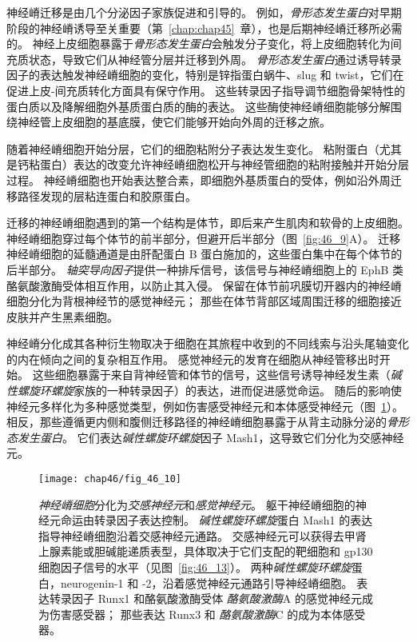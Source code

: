 神经嵴迁移是由几个分泌因子家族促进和引导的。
例如，\textit{骨形态发生蛋白}对早期阶段的神经嵴诱导至关重要（第~\ref{chap:chap45}~章），也是后期神经嵴迁移所必需的。
神经上皮细胞暴露于\textit{骨形态发生蛋白}会触发分子变化，将上皮细胞转化为间充质状态，导致它们从神经管分层并迁移到外周。
\textit{骨形态发生蛋白}通过诱导转录因子的表达触发神经嵴细胞的变化，特别是锌指蛋白蜗牛、slug 和 twist，它们在促进上皮-间充质转化方面具有保守作用。
这些转录因子指导调节细胞骨架特性的蛋白质以及降解细胞外基质蛋白质的酶的表达。
这些酶使神经嵴细胞能够分解围绕神经管上皮细胞的基底膜，使它们能够开始向外周的迁移之旅。


随着神经嵴细胞开始分层，它们的细胞粘附分子表达发生变化。
粘附蛋白（尤其是钙粘蛋白）表达的改变允许神经嵴细胞松开与神经管细胞的粘附接触并开始分层过程。
神经嵴细胞也开始表达整合素，即细胞外基质蛋白的受体，例如沿外周迁移路径发现的层粘连蛋白和胶原蛋白。


迁移的神经嵴细胞遇到的第一个结构是体节，即后来产生肌肉和软骨的上皮细胞。
神经嵴细胞穿过每个体节的前半部分，但避开后半部分（图~\ref{fig:46_9}A）。
迁移神经嵴细胞的延髓通道是由肝配蛋白 B 蛋白施加的，这些蛋白集中在每个体节的后半部分。
\textit{轴突导向因子}提供一种排斥信号，该信号与神经嵴细胞上的 EphB 类酪氨酸激酶受体相互作用，以防止其入侵。
保留在体节前巩膜切开器内的神经嵴细胞分化为背根神经节的感觉神经元；
那些在体节背部区域周围迁移的细胞接近皮肤并产生黑素细胞。


神经嵴分化成其各种衍生物取决于细胞在其旅程中收到的不同线索与沿头尾轴变化的内在倾向之间的复杂相互作用。
感觉神经元的发育在细胞从神经管移出时开始。
这些细胞暴露于来自背神经管和体节的信号，这些信号诱导神经发生素（\textit{碱性螺旋环螺旋}家族的一种转录因子）的表达，进而促进感觉命运。
随后的影响使神经元多样化为多种感觉类型，例如伤害感受神经元和本体感受神经元（图~\ref{fig:46_10}）。
相反，那些遵循更内侧和腹侧迁移路径的神经嵴细胞暴露于从背主动脉分泌的\textit{骨形态发生蛋白}。
它们表达\textit{碱性螺旋环螺旋}因子 Mash1，这导致它们分化为交感神经元。


\begin{figure}[htbp]
	\centering
	\texttt{[image: chap46/fig\_46\_10]}
	\caption{\textit{神经嵴细胞}分化为\textit{交感神经元}和\textit{感觉神经元}。
		躯干神经嵴细胞的神经元命运由转录因子表达控制。
		\textit{碱性螺旋环螺旋}蛋白 Mash1 的表达指导神经嵴细胞沿着交感神经元通路。
		交感神经元可以获得去甲肾上腺素能或胆碱能递质表型，具体取决于它们支配的靶细胞和 gp130 细胞因子信号的水平（见图~\ref{fig:46_13}）。
		两种\textit{碱性螺旋环螺旋}蛋白，neurogenin-1 和 -2，沿着感觉神经元通路引导神经嵴细胞。
		表达转录因子 Runx1 和酪氨酸激酶受体 \textit{酪氨酸激酶}A 的感觉神经元成为伤害感受器；
		那些表达 Runx3 和 \textit{酪氨酸激酶}C 的成为本体感受器。}
	\label{fig:46_10}
\end{figure}



